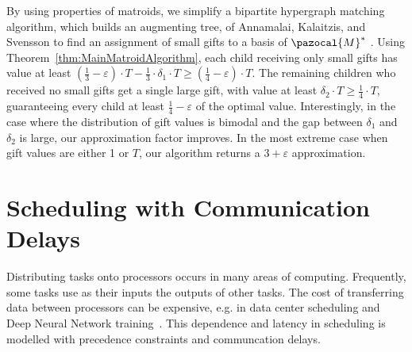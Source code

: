 By using properties of matroids, 
we simplify a bipartite hypergraph matching algorithm, which builds an augmenting tree,
of Annamalai, Kalaitzis, and Svensson to find an assignment of small gifts to a basis of $\pazocal{M}^*$ \cite{AlgoForSantaClaus-AnnamalaiKalaitzisSvenssonSODA15}.
Using Theorem~\ref{thm:MainMatroidAlgorithm}, each child receiving only small gifts has value at least
$\left (\frac13 - \varepsilon \right ) \cdot T - \frac13 \cdot \delta_1 \cdot T \geq \left (\frac14 - \varepsilon \right ) \cdot T$. 
The remaining children who received no small gifts get a single large gift, with value at least $\delta_2 \cdot T \geq \frac14 \cdot T$,
guaranteeing every child at least $\frac14 - \varepsilon$ of the optimal value.
Interestingly, in the case where the distribution of gift values is bimodal and the gap between $\delta_1$ and $\delta_2$ is large, 
our approximation factor improves.
In the most extreme case when gift values are either 1 or $T$, 
our algorithm returns a $3 + \varepsilon$ approximation. 









\section{Scheduling with Communication Delays} 


Distributing tasks onto processors occurs in many areas of computing.
Frequently, some tasks use as their inputs the outputs of other tasks. 
The cost of transferring data between processors can be expensive, 
e.g. in data center scheduling and Deep Neural Network training~\cite{coflow, zhao2015rapier}. 
This dependence and latency in scheduling is modelled with precedence constraints and communcation delays.

